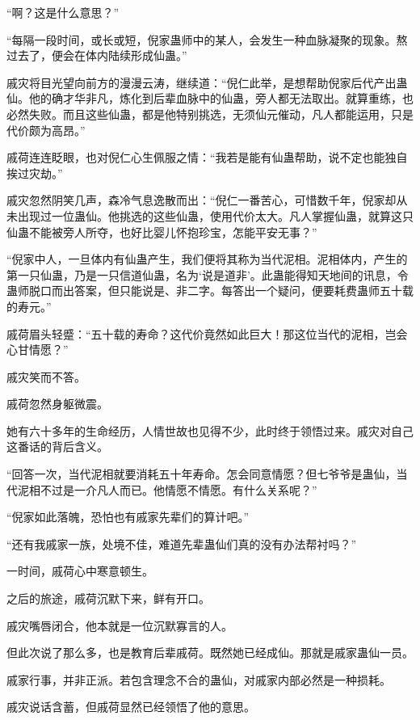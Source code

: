 
\begin{this_body}

“啊？这是什么意思？”

“每隔一段时间，或长或短，倪家蛊师中的某人，会发生一种血脉凝聚的现象。熬过去了，便会在体内陆续形成仙蛊。”

戚灾将目光望向前方的漫漫云涛，继续道：“倪仁此举，是想帮助倪家后代产出蛊仙。他的确才华非凡，炼化到后辈血脉中的仙蛊，旁人都无法取出。就算重练，也必然失败。而且这些仙蛊，都是他特别挑选，无须仙元催动，凡人都能运用，只是代价颇为高昂。”

戚荷连连眨眼，也对倪仁心生佩服之情：“我若是能有仙蛊帮助，说不定也能独自挨过灾劫。”

戚灾忽然阴笑几声，森冷气息逸散而出：“倪仁一番苦心，可惜数千年，倪家却从未出现过一位蛊仙。他挑选的这些仙蛊，使用代价太大。凡人掌握仙蛊，就算这只仙蛊不能被旁人所夺，也好比婴儿怀抱珍宝，怎能平安无事？”

“倪家中人，一旦体内有仙蛊产生，我们便将其称为当代泥相。泥相体内，产生的第一只仙蛊，乃是一只信道仙蛊，名为‘说是道非’。此蛊能得知天地间的讯息，令蛊师脱口而出答案，但只能说是、非二字。每答出一个疑问，便要耗费蛊师五十载的寿元。”

戚荷眉头轻蹙：“五十载的寿命？这代价竟然如此巨大！那这位当代的泥相，岂会心甘情愿？”

戚灾笑而不答。

戚荷忽然身躯微震。

她有六十多年的生命经历，人情世故也见得不少，此时终于领悟过来。戚灾对自己这番话的背后含义。

“回答一次，当代泥相就要消耗五十年寿命。怎会同意情愿？但七爷爷是蛊仙，当代泥相不过是一介凡人而已。他情愿不情愿。有什么关系呢？”

“倪家如此落魄，恐怕也有戚家先辈们的算计吧。”

“还有我戚家一族，处境不佳，难道先辈蛊仙们真的没有办法帮衬吗？”

一时间，戚荷心中寒意顿生。

之后的旅途，戚荷沉默下来，鲜有开口。

戚灾嘴唇闭合，他本就是一位沉默寡言的人。

但此次说了那么多，也是教育后辈戚荷。既然她已经成仙。那就是戚家蛊仙一员。

戚家行事，并非正派。若包含理念不合的蛊仙，对戚家内部必然是一种损耗。

戚灾说话含蓄，但戚荷显然已经领悟了他的意思。


\end{this_body}
